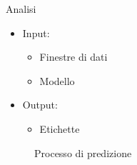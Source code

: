 \begin{tframe}{Analisi}

    \begin{minipage}{0.45\textwidth}
        
        \begin{itemize}
            \item Input:
                \begin{itemize}
                    \item Finestre di dati
                    \item Modello 
                \end{itemize}
        \end{itemize}

    \end{minipage}%
    \hfill
    \begin{minipage}{0.55\textwidth}
        
        \begin{itemize}
            \item Output:
                \begin{itemize}
                    \item Etichette
                \end{itemize}
        \end{itemize}
        \vspace{3mm}
        
    \end{minipage}%

    \vspace{5mm}

    \begin{figure}
        
        \caption*{Processo di predizione}
    \end{figure}

\end{tframe}